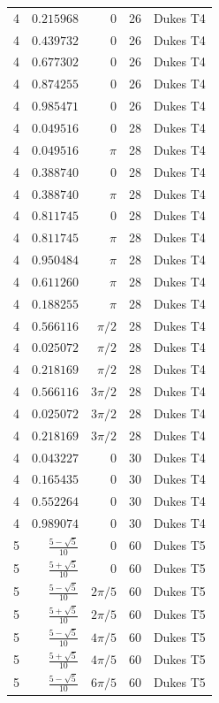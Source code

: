 \begin{longtable}{rrrrc}
4 & $0.215968$ & $0$ & 26 & Dukes T4 \\
4 & $0.439732$ & $0$ & 26 & Dukes T4 \\
4 & $0.677302$ & $0$ & 26 & Dukes T4 \\
4 & $0.874255$ & $0$ & 26 & Dukes T4 \\
4 & $0.985471$ & $0$ & 26 & Dukes T4 \\
4 & $0.049516$ & $0$ & 28 & Dukes T4 \\
4 & $0.049516$ & $\pi$ & 28 & Dukes T4 \\
4 & $0.388740$ & $0$ & 28 & Dukes T4 \\
4 & $0.388740$ & $\pi$ & 28 & Dukes T4 \\
4 & $0.811745$ & $0$ & 28 & Dukes T4 \\
4 & $0.811745$ & $\pi$ & 28 & Dukes T4 \\
4 & $0.950484$ & $\pi$ & 28 & Dukes T4 \\
4 & $0.611260$ & $\pi$ & 28 & Dukes T4 \\
4 & $0.188255$ & $\pi$ & 28 & Dukes T4 \\
4 & $0.566116$ & $\pi/2$ & 28 & Dukes T4 \\
4 & $0.025072$ & $\pi/2$ & 28 & Dukes T4 \\
4 & $0.218169$ & $\pi/2$ & 28 & Dukes T4 \\
4 & $0.566116$ & $3\pi/2$ & 28 & Dukes T4 \\
4 & $0.025072$ & $3\pi/2$ & 28 & Dukes T4 \\
4 & $0.218169$ & $3\pi/2$ & 28 & Dukes T4 \\
4 & $0.043227$ & $0$ & 30 & Dukes T4 \\
4 & $0.165435$ & $0$ & 30 & Dukes T4 \\
4 & $0.552264$ & $0$ & 30 & Dukes T4 \\
4 & $0.989074$ & $0$ & 30 & Dukes T4 \\
5 & $\frac{5 - \sqrt{5}}{10}$ & $0$ & 60 & Dukes T5 \\
5 & $\frac{5 + \sqrt{5}}{10}$ & $0$ & 60 & Dukes T5 \\
5 & $\frac{5 - \sqrt{5}}{10}$ & $2\pi/5$ & 60 & Dukes T5 \\
5 & $\frac{5 + \sqrt{5}}{10}$ & $2\pi/5$ & 60 & Dukes T5 \\
5 & $\frac{5 - \sqrt{5}}{10}$ & $4\pi/5$ & 60 & Dukes T5 \\
5 & $\frac{5 + \sqrt{5}}{10}$ & $4\pi/5$ & 60 & Dukes T5 \\
5 & $\frac{5 - \sqrt{5}}{10}$ & $6\pi/5$ & 60 & Dukes T5 \\

\end{longtable}

